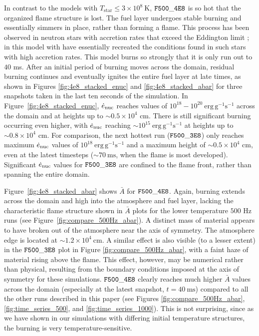 \documentclass[preprint,times,tighten]{aastex63}
\newcommand{\enucdot}{\dot{e}_{\rm nuc}}
\newcommand{\MarginPar}[1]{
    \marginpar{\vskip-\baselineskip%
               \raggedright%
               \tiny\sffamily%
               {\color{red}\hrule%
               \smallskip%
               #1\par%
               \smallskip%
               \hrule}}%
}
\begin{document}
In contrast to the models with $T_{\mathrm{star}} \leq 3 \times 10^8~\mathrm{K}$, $\tt{F500\_4E8}$ is so hot that the organized flame structure is lost. The fuel layer undergoes stable burning and essentially simmers in place, rather than forming a flame. This process has been observed in neutron stars with accretion rates that exceed the Eddington limit \citep{fujimoto1981,bildsten1998thermonuclear,keek2009effect}; in this model with have essentially recreated the conditions found in such stars with high accretion rates. This model burns so strongly that it is only run out to $40$ ms. After an initial period of burning moves across the domain, residual burning continues and eventually ignites the entire fuel layer at late times, as shown in Figures \ref{fig:4e8_stacked_enuc} and \ref{fig:4e8_stacked_abar} for three snapshots taken in the last ten seconds of the simulation. In Figure~\ref{fig:4e8_stacked_enuc}, $\enucdot$ reaches values of $10^{18} - 10^{20}~\mathrm{erg}\,\mathrm{g}^{-1} \mathrm{s}^{-1}$ across the domain and at heights up to $\sim 0.5\times 10^4$ cm. There is still significant burning occurring even higher, with $\enucdot$ reaching $\sim 10^{15}~\mathrm{erg}\,\mathrm{g}^{-1} \mathrm{s}^{-1}$ at heights up to $\sim 0.8\times 10^4$ cm. For comparison, the next hottest run ($\tt{F500\_3E8}$) only reaches maximum $\enucdot$ values of $10^{18}~\mathrm{erg}\,\mathrm{g}^{-1} \mathrm{s}^{-1}$ and a maximum height of $\sim 0.5\times 10^4$ cm, even at the latest timesteps ($\sim 70~\mathrm{ms}$, when the flame is most developed). Significant $\enucdot$ values for $\tt{F500\_3E8}$ are confined to the flame front, rather than spanning the entire domain.

\MarginPar{NF: should I include a plot for this or is it ok to just say it?}
Figure~\ref{fig:4e8_stacked_abar} shows $\bar{A}$ for $\tt{F500\_4E8}$. Again, burning extends across the domain and high into the atmosphere and fuel layer, lacking the characteristic flame structure shown in $\bar{A}$ plots for the lower temperature $500$ Hz runs (see Figure~\ref{fig:compare_500Hz_abar}). A distinct mass of material appears to have broken out of the atmosphere near the axis of symmetry. The atmosphere edge is located at $\sim 1.2\times 10^4~\mathrm{cm}$. {\color{blue}A similar effect is also visible (to a lesser extent) in the $\tt{F500\_3E8}$ plot in Figure \ref{fig:compare_500Hz_abar}, with a faint haze of material rising above the flame. This effect, however, may be numerical rather than physical, resulting from the boundary conditions imposed at the axis of symmetry for these simulations.} $\tt{F500\_4E8}$ clearly reaches much higher $\bar{A}$ values across the domain (especially at the latest snapshot, $t = 40~\mathrm{ms}$) compared to all the other runs described in this paper (see Figures \ref{fig:compare_500Hz_abar}, \ref{fig:time_series_500}, and \ref{fig:time_series_1000}). This is not surprising, since as we have shown in our simulations with differing initial temperature structures, the burning is very temperature-sensitive. 
\end{document}
